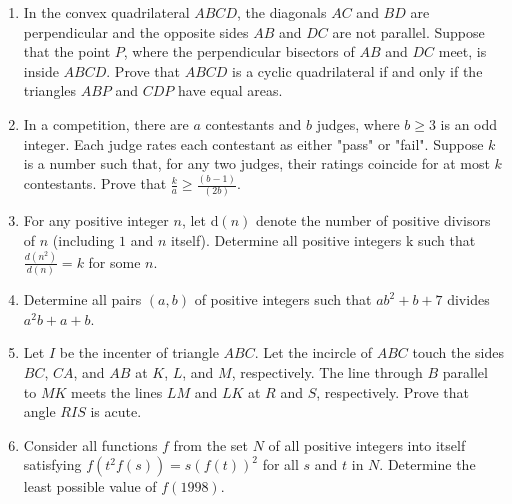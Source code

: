 \documentclass[12pt,-letter paper]{article}
\providecommand{\brak}[1]{\ensuremath{\left(#1\right)}}
\begin{document}
\begin{enumerate}
\item In the convex quadrilateral $ABCD$, the diagonals $AC$ and $BD$ are perpendicular and the opposite sides $AB$ and $DC$ are not parallel. Suppose that the point $P$, where the perpendicular bisectors of $AB$ and $DC$ meet, is inside $ABCD$. Prove that $ABCD$ is a cyclic quadrilateral if and only if the triangles $ABP$ and $CDP$ have equal areas.
\item In a competition, there are $a$ contestants and $b$ judges, where $ b \geq 3$ is an odd integer. Each judge rates each contestant as either "pass" or "fail". Suppose $k$ is a number such that, for any two judges, their ratings coincide for at most $k$ contestants. Prove that $ \frac{k}{a} \geq \frac{\brak{b-1}}{\brak{2b}}$.
\item For any positive integer $n$, let d{\brak{n}} denote the number of positive divisors of $n$ (including $1$ and $n$ itself). Determine all positive integers k such that $ \frac{d\brak{n^2}} {d\brak{n}}  = k$ for some $n$.
\item Determine all pairs \brak{a, b} of positive integers such that $ab^2 + b + 7$ divides $a^2b + a + b$.
\item Let $I$ be the incenter of triangle $ABC$. Let the incircle of $ABC$ touch the sides $BC$, $CA$, and $AB$ at $K$, $L$, and $M$, respectively. The line through $B$ parallel to $MK$ meets the lines $LM$ and $LK$ at $R$ and $S$, respectively. Prove that angle $RIS$ is acute.
\item  Consider all functions $f$ from the set $N$ of all positive integers into itself satisfying $f\brak{t^2f\brak{s}} = s\brak{f\brak{t}}^2$ for all $s$ and $t$ in $N$. Determine the least possible value of ${f\brak{1998}}$.	
\end{enumerate}
\end{document}
